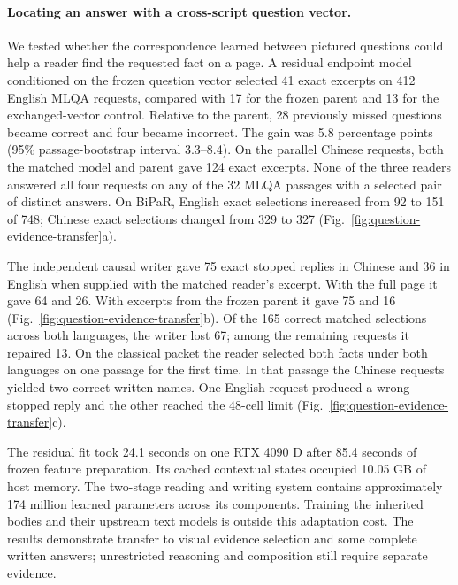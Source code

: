 \paragraph{Locating an answer with a cross-script question vector.}
We tested whether the correspondence learned between pictured questions could help a reader find the requested fact on a page. A residual endpoint model conditioned on the frozen question vector selected 41 exact excerpts on 412 English MLQA requests, compared with 17 for the frozen parent and 13 for the exchanged-vector control. Relative to the parent, 28 previously missed questions became correct and four became incorrect. The gain was 5.8 percentage points (95\% passage-bootstrap interval 3.3--8.4). On the parallel Chinese requests, both the matched model and parent gave 124 exact excerpts. None of the three readers answered all four requests on any of the 32 MLQA passages with a selected pair of distinct answers. On BiPaR, English exact selections increased from 92 to 151 of 748; Chinese exact selections changed from 329 to 327 (Fig.~\ref{fig:question-evidence-transfer}a).

The independent causal writer gave 75 exact stopped replies in Chinese and 36 in English when supplied with the matched reader's excerpt. With the full page it gave 64 and 26. With excerpts from the frozen parent it gave 75 and 16 (Fig.~\ref{fig:question-evidence-transfer}b). Of the 165 correct matched selections across both languages, the writer lost 67; among the remaining requests it repaired 13. On the classical packet the reader selected both facts under both languages on one passage for the first time. In that passage the Chinese requests yielded two correct written names. One English request produced a wrong stopped reply and the other reached the 48-cell limit (Fig.~\ref{fig:question-evidence-transfer}c).

The residual fit took 24.1 seconds on one RTX 4090 D after 85.4 seconds of frozen feature preparation. Its cached contextual states occupied 10.05 GB of host memory. The two-stage reading and writing system contains approximately 174 million learned parameters across its components. Training the inherited bodies and their upstream text models is outside this adaptation cost. The results demonstrate transfer to visual evidence selection and some complete written answers; unrestricted reasoning and composition still require separate evidence.
